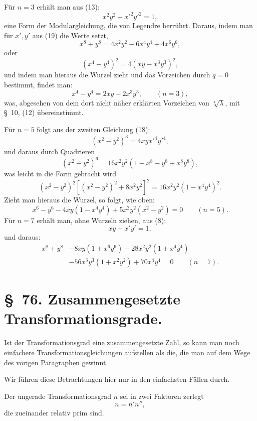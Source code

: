 \documentclass[11pt]{article}
\begin{document}
Für $n=3$ erhält man aus (13):
\begin{equation}
 x^2y^2+x'^2y'^2=1,
\tag{20}
\end{equation}
eine Form der Modulargleichung, die von Legendre herrührt. Daraus, indem man für $x',y'$ aus (19) die Werte setzt,
\[
 x^8+y^8=4x^2y^2-6x^4y^4+4x^6y^6,
\]
oder
\[
 (x^4-y^4)^2=4(xy-x^3y^3)^2,
\]
und indem man hieraus die Wurzel zieht und das Vorzeichen durch $q=0$ bestimmt, findet man:
\begin{equation}
 x^4-y^4=2xy-2x^3y^3,
 \qquad (n=3),
\tag{21}
\end{equation}
was, abgesehen von dem dort nicht näher erklärten Vorzeichen von $\sqrt[4]{\lambda}$, mit \S~10, (12) übereinstimmt.

Für $n=5$ folgt aus der zweiten Gleichung (18):
\[
 (x^2-y^2)^3=4xyx'^4y'^4,
\]
und daraus durch Quadrieren
\[
 (x^2-y^2)^6=16x^2y^2(1-x^8-y^8+x^8y^8),
\]
was leicht in die Form gebracht wird
\[
 (x^2-y^2)^2[(x^2-y^2)^2+8x^2y^2]^2=16x^2y^2(1-x^4y^4)^2.
\]
Zieht man hieraus die Wurzel, so folgt, wie oben:
\begin{equation}
 x^6-y^6-4xy(1-x^4y^4)+5x^2y^2(x^2-y^2)=0\qquad(n=5).
\tag{22}
\end{equation}
Für $n=7$ erhält man, ohne Wurzeln ziehen, aus (8):
\begin{equation}
 xy+x'y'=1,
\tag{23}
\end{equation}
und daraus:
\begin{equation}
\begin{aligned}
 x^8+y^8&-8xy(1+x^6y^6)+28x^2y^2(1+x^4y^4)\\
&-56x^3y^3(1+x^2y^2)+70x^4y^4=0\qquad(n=7).
\end{aligned}
\tag{24}
\end{equation}

\section*{\S~76. Zusammengesetzte Transformationsgrade.}

Ist der Transformationsgrad eine zusammengesetzte Zahl, so kann man noch einfachere Transformationsgleichungen aufstellen als die, die man auf dem Wege des vorigen Paragraphen gewinnt.

Wir führen diese Betrachtungen hier nur in den einfachsten Fällen durch.

Der ungerade Transformationsgrad $n$ sei in zwei Faktoren zerlegt
\begin{equation}
 n=n'n'',
\tag{1}
\end{equation}
die zueinander relativ prim sind.
\end{document}
